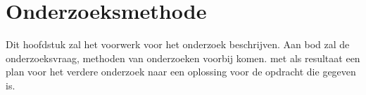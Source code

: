 \chapter{Onderzoeksmethode}\label{ch:onderzoeksmethode}
Dit hoofdstuk zal het voorwerk voor het onderzoek beschrijven. Aan bod zal de onderzoeksvraag, methoden van onderzoeken voorbij komen. met als resultaat een plan voor het verdere onderzoek naar een oplossing voor de opdracht die gegeven is.


\
